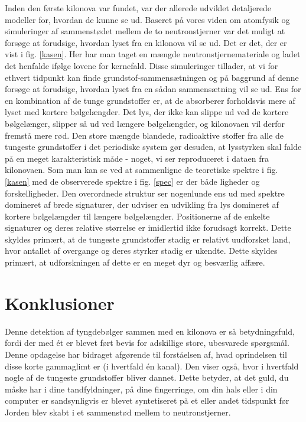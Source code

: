\documentclass[twocolumn]{article}
\begin{document}
Inden den første kilonova var fundet, var der allerede udviklet detaljerede modeller for, hvordan de kunne se ud. Baseret på vores viden om atomfysik og  simuleringer af sammenstødet mellem de to neutronstjerner var det muligt at forsøge at forudsige, hvordan lyset fra en kilonova vil se ud. Det er det, der er vist i fig. \ref{kasen}. Her har man taget en mængde neutronstjernemateriale og ladet det henfalde ifølge lovene for kernefald. Disse simuleringer tillader, at vi for ethvert tidpunkt kan finde grundstof-sammensætningen og på baggrund af denne forsøge at forudsige, hvordan lyset fra en sådan sammensætning vil se ud. Ens for en kombination af de tunge grundstoffer er, at de absorberer forholdsvis mere af lyset med kortere bølgelængder. Det lys, der ikke kan slippe ud ved de kortere bølgelænger, slipper så ud ved længere bølgelængder, og kilonovaen vil derfor fremstå mere rød. Den store mængde blandede, radioaktive stoffer fra alle de tungeste grundstoffer i det periodiske system gør desuden, at lysstyrken skal falde på en meget karakteristisk måde - noget, vi ser reproduceret i dataen fra kilonovaen. Som man kan se ved at sammenligne de teoretiske spektre i fig. \ref{kasen} med de observerede spektre i fig. \ref{spec} er der både ligheder og forskelligheder. Den overordnede struktur ser nogenlunde ens ud med spektre domineret af brede signaturer, der udviser en udvikling fra lys domineret af kortere bølgelængder til længere bølgelængder. Positionerne af de enkelte signaturer og deres relative størrelse er imidlertid ikke forudsagt korrekt. Dette skyldes primært, at de tungeste grundstoffer stadig er relativt uudforsket land, hvor antallet af overgange og deres styrker stadig er ukendte. Dette skyldes primært, at udforskningen af dette er en meget dyr og besværlig affære.



\section{Konklusioner}
Denne detektion af tyngdebølger sammen med en kilonova er så betydningsfuld, fordi der med ét er blevet ført bevis for adskillige store, ubesvarede spørgsmål. Denne opdagelse har bidraget afgørende til forståelsen af, hvad oprindelsen til disse korte gammaglimt er (i hvertfald én kanal). Den viser også, hvor i hvertfald nogle af de tungeste grundstoffer bliver dannet. Dette betyder, at det guld, du måske har i dine tandfyldninger, på dine fingerringe, om din hals eller i din computer er sandsynligvis er blevet syntetiseret på et eller andet tidspunkt før Jorden blev skabt i et sammenstød mellem to neutronstjerner. 
\end{document}
